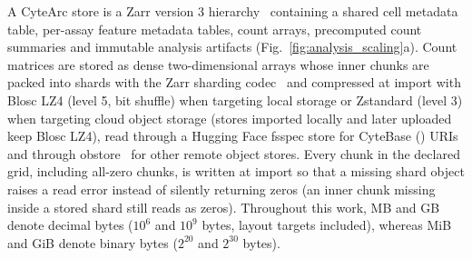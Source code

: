 \documentclass[11pt]{article}
\begin{document}
A CyteArc store is a Zarr version 3 hierarchy~\cite{zarrv3spec} containing a shared cell metadata table, per-assay feature metadata tables, count arrays, precomputed count summaries and immutable analysis artifacts (Fig.~\ref{fig:analysis_scaling}a). Count matrices are stored as dense two-dimensional arrays whose inner chunks are packed into shards with the Zarr sharding codec~\cite{zarrsharding} and compressed at import with Blosc LZ4 (level 5, bit shuffle) when targeting local storage or Zstandard (level 3) when targeting cloud object storage (stores imported locally and later uploaded keep Blosc LZ4), read through a Hugging Face fsspec store for CyteBase () URIs and through obstore~\cite{obstore} for other remote object stores. Every chunk in the declared grid, including all-zero chunks, is written at import so that a missing shard object raises a read error instead of silently returning zeros (an inner chunk missing inside a stored shard still reads as zeros). Throughout this work, MB and GB denote decimal bytes ($10^{6}$ and $10^{9}$ bytes, layout targets included), whereas MiB and GiB denote binary bytes ($2^{20}$ and $2^{30}$ bytes).
\end{document}
